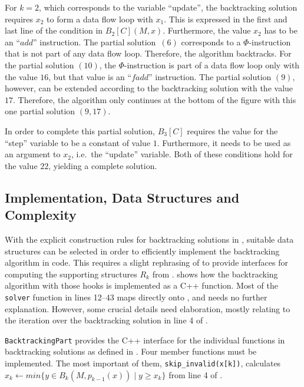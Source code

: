     For $k=2$, which corresponds to the variable ``update'', the backtracking
    solution requires $x_2$ to form a data flow loop with $x_1$.
    This is expressed  in the first and last line of the condition in
    $B_2[C](M,x)$.
    Furthermore, the value $x_2$ has to be an ``$add$'' instruction.
    The partial solution~$(6)$ corresponds to a $\Phi$-instruction that is not
    part of any data flow loop.
    Therefore, the algorithm backtracks.
    For the partial solution $(10)$, the $\Phi$-instruction is part of a data
    flow loop only with the value $16$, but that value is an ``$fadd$''
    instruction.
    The partial solution $(9)$, however, can be extended according to the
    backtracking solution with the value $17$.
    Therefore, the algorithm only continues at the bottom of the figure with
    this one partial solution $(9,17)$.

    In order to complete this partial solution, $B_3[C]$ requires the value for
    the ``step'' variable to be a constant of value $1$.
    Furthermore, it needs to be used as an argument to $x_2$, i.e.\ the
    ``update'' variable.
    Both of these conditions hold for the value $22$, yielding a complete
    solution.

\subsection{Implementation, Data Structures and Complexity}
\label{subsec:impl}

\begin{figure}[p]
    
\end{figure}

    With the explicit construction rules for backtracking solutions in
    , suitable data structures
    can be selected in order to efficiently implement the
    backtracking algorithm in code.
    This requires a slight rephrasing of  to provide
    interfaces for computing the supporting structures $R_k$ from
    .
     shows how the backtracking algorithm with those hooks is
    implemented as a C++ function.
    Most of the \texttt{solver} function in lines 12--43 maps directly onto
    , and needs no further explanation.
    However, some crucial details need elaboration, mostly relating to the
    iteration over the backtracking solution in line 4 of .

    {\tt BacktrackingPart} provides the C++ interface for the individual
    functions in backtracking solutions as defined in .
    Four member functions must be implemented.
    The most important of them, \texttt{skip\_invalid(x[k])}, calculates
    $x_k\gets min\{y\in B_k(M,p_{k-1}(x))\mid y\geq x_k\}$
    from line 4 of .

